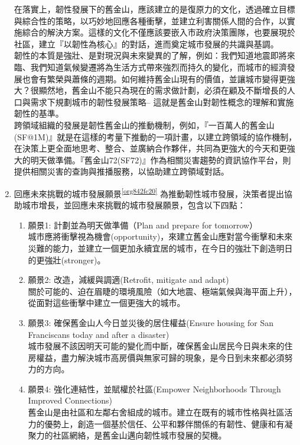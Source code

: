\documentclass[a4paper,12pt]{article}
\begin{document}
\begin{enumerate}
在落實上，韌性發展下的舊金山，應該建立的是復原力的文化，透過確立目標與綜合性的策略，以巧妙地回應各種衝擊，並建立利害關係人間的合作，以實施綜合的解決方案。這樣的文化不僅應該要嵌入市政府決策團隊，也要展現於社區，建立『以韌性為核心』的對話，進而奠定城市發展的共識與基調。\\

韌性的本質是強壯、是對現況與未來變異的了解，例如：我們知道地震即將來臨、我們知道氣候變遷將為生活方式帶來強烈而持久的變化，而城市的經濟發展也會有繁榮與蕭條的週期。如何維持舊金山現有的價值，並讓城市變得更強大？很顯然地，舊金山不能只為現在的需求做計劃，必須在顧及不斷增長的人口與需求下規劃城市的韌性發展策略– 這就是舊金山對韌性概念的理解和實施韌性的基準。\\

跨領域組織的發展是韌性舊金山的推動機制，例如，『一百萬人的舊金山(SF@1M)』就是在這樣的考量下推動的一項計畫，以建立跨領域的協作機制，在決策上更全面地思考、整合、並廣納合作夥伴，共同為更強大的今天和更強大的明天做準備。『舊金山72(SF72)』作為相關災害趨勢的資訊協作平台，則提供相關災害的查詢與推播服務，以協助建立跨領域對話。\\

\item 回應未來挑戰的城市發展願景\textsuperscript{\ref{org842fc20}}
\label{sec:org33398e4}
為推動韌性城市發展，決策者提出協助城市增長，並回應未來挑戰的城市發展願景，包含以下四點：\\
\begin{enumerate}
\item 願景1: 計劃並為明天做準備（Plan and prepare for tomorrow）\\
城市應將衝擊視為機會(opportunity)，來建立舊金山應對當今衝擊和未來災難的能力，並建立一個更加永續宜居的城市，在今日的強壯下創造明日的更強壯(stronger)。\\
\item 願景2: 改造，減緩與調適(Retrofit, mitigate and adapt)\\
關於可能的、迫在眉睫的環境風險（如大地震、極端氣候與海平面上升），從面對這些衝擊中建立一個更強大的城市。\\
\item 願景3: 確保舊金山人今日並災後的居住權益(Ensure housing for San Franciscans today and after a disaster)\\
城市發展不該因明天可能的變化而中斷，確保舊金山居民今日與未來的住房權益，盡力解決城市高房價與無家可歸的現象，是今日到未來都必須努力的方向。\\
\item 願景4: 強化連結性，並賦權於社區(Empower Neighborhoods Through Improved Connections)\\
舊金山是由社區和左鄰右舍組成的城市。建立在既有的城市性格與社區活力的優勢上，創造一個基於信任、公平和夥伴關係的有韌性、健康和有凝聚力的社區網絡，是舊金山邁向韌性城市發展的契機。\\
\end{enumerate}


\end{enumerate}
\end{document}
